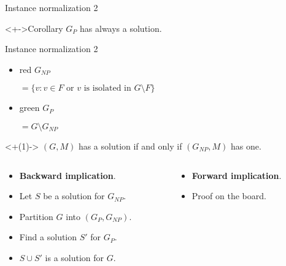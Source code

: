 \documentclass{beamer}
\begin{document}
\begin{frame}[t]{Instance normalization 2}
{
	} 
	
	\bigskip

	\begin{block}<+->{Corollary}
		$G_P$ has always a solution.
	\end{block}
\end{frame}

\begin{frame}[t]{Instance normalization 2}
	\begin{itemize}
		\item[] {
			\begin{color}{red}
				$G_{NP}$
			\end{color}
			$= \{v: v \in F \text{ or $v$ is isolated in } G \setminus F\}$
		}
		\item[] {
			\begin{color}{green}
				$G_P$
			\end{color}
			$ = G \setminus G_{NP}$
		}
	\end{itemize}
	\begin{Lemma}<+(1)->
		$(G,M)$ has a solution if and only if $(G_{NP},M)$ has one.
	\end{Lemma}
	\begin{columns}[t]
		\begin{column}{0.5\textwidth}
			\begin{itemize}[<+(1)->]
				\item[] \textbf{Backward implication}.
				\item[] Let $S$ be a solution for $G_{NP}$.
				\item[] Partition $G$ into $(G_P, G_{NP})$.
				\item[] Find a solution $S'$ for $G_P$.
				\item[] $S \cup S'$ is a solution for $G$.
			\end{itemize}
		\end{column}
		\begin{column}{0.5\textwidth}
			\begin{itemize}[<+(1)->]
				\item[] \textbf{Forward implication}.
				\item[] Proof on the board.
			\end{itemize}
		\end{column}
	\end{columns}
	
\end{frame}
\end{document}
